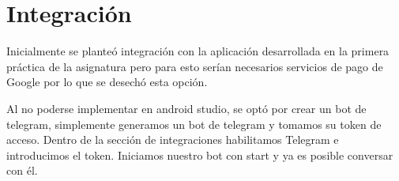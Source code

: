 \section{Integración}

Inicialmente se planteó integración con la aplicación desarrollada en la primera práctica de la asignatura pero para esto serían necesarios servicios de pago de Google por lo que se desechó esta opción.

Al no poderse implementar en android studio, se optó por crear un bot de telegram, simplemente generamos un bot de telegram y tomamos su token de acceso. Dentro de la sección de integraciones habilitamos Telegram e introducimos el token. Iniciamos nuestro bot con start y ya es posible conversar con él.
